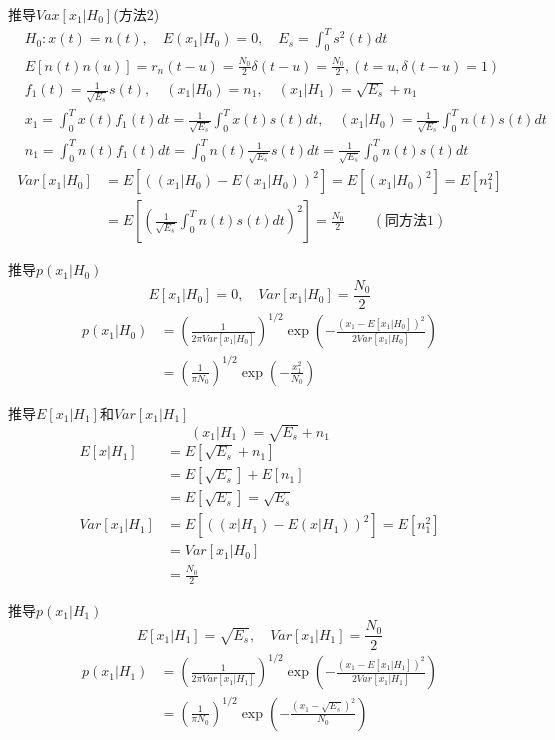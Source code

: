 \begin{frame}[shrink]{推导$Vax[x_1|H_0]$(方法2)}
\begin{align*}
&H_0: x(t)=n(t),\quad E(x_1|H_0)=0,\quad E_s=\int_{0}^{T}s^2(t)dt\\
&E[n(t)n(u)]=r_n(t-u)=\frac{N_0}{2}\delta(t-u)=\frac{N_0}{2},(t=u,\delta(t-u)=1)\\
&f_1(t)=\frac{1}{\sqrt{E_s}}s(t),\quad (x_1|H_0)=n_1,\quad (x_1|H_1)=\sqrt{E_s}+n_1\\ &x_1=\int_{0}^{T}x(t)f_1(t)dt=\frac{1}{\sqrt{E_s}}\int_{0}^{T}x(t)s(t)dt,\quad (x_1|H_0)=\frac{1}{\sqrt{E_s}}\int_{0}^{T}n(t)s(t)dt\\
&n_1=\int_{0}^{T}n(t)f_1(t)dt=\int_{0}^{T}n(t)\frac{1}{\sqrt{E_s}}s(t)dt=\frac{1}{\sqrt{E_s}}\int_{0}^{T}n(t)s(t)dt
\end{align*}
\begin{align*}
Var[x_1|H_0]&=E[((x_1|H_0)-E(x_1|H_0))^2]=E[(x_1|H_0)^2]=E[n_1^2]\\
&=E\left[\left(\frac{1}{\sqrt{E_s}}\int_{0}^{T}n(t)s(t)dt\right)^2\right]=\frac{N_0}{2}\qquad (\text{同方法1})
\end{align*}
\end{frame}

\begin{frame}{推导$p(x_1|H_0)$}
\[ E[x_1|H_0]=0,\quad Var[x_1|H_0]=\frac{N_0}{2}\]
\begin{align*}
p(x_1|H_0)&=\left(\frac{1}{2\pi Var[x_1|H_0]}\right)^{1/2}\exp\left(-\frac{(x_1-E[x_1|H_0])^2}{2Var[x_1|H_0]}\right)\\
&=\left(\frac{1}{\pi N_0}\right)^{1/2}\exp\left(-\frac{x_1^2}{N_0}\right)
\end{align*}
\end{frame}

\begin{frame}{推导$E[x_1|H_1]$和$Var[x_1|H_1]$}
\[(x_1|H_1)=\sqrt{E_s}+n_1\]
\begin{align*}
E[x|H_1]&=E\left[\sqrt{E_s}+n_1\right]\\
&=E[\sqrt{E_s}]+E[n_1]\\
&=E[\sqrt{E_s}]=\sqrt{E_s}\\
Var[x_1|H_1]&=E[((x|H_1)-E(x|H_1))^2]=E[n_1^2]\\
&=Var[x_1|H_0]\\
&=\frac{N_0}{2}
\end{align*}
\end{frame}

\begin{frame}{推导$p(x_1|H_1)$}
\[ E[x_1|H_1]=\sqrt{E_s},\quad Var[x_1|H_1]=\frac{N_0}{2}\]
\begin{align*}
p(x_1|H_1)&=\left(\frac{1}{2\pi Var[x_1|H_1]}\right)^{1/2}\exp\left(-\frac{(x_1-E[x_1|H_1])^2}{2Var[x_1|H_1]}\right)\\
&=\left(\frac{1}{\pi N_0}\right)^{1/2}\exp\left(-\frac{(x_1-\sqrt{E_s})^2}{N_0}\right)
\end{align*}
\end{frame}

